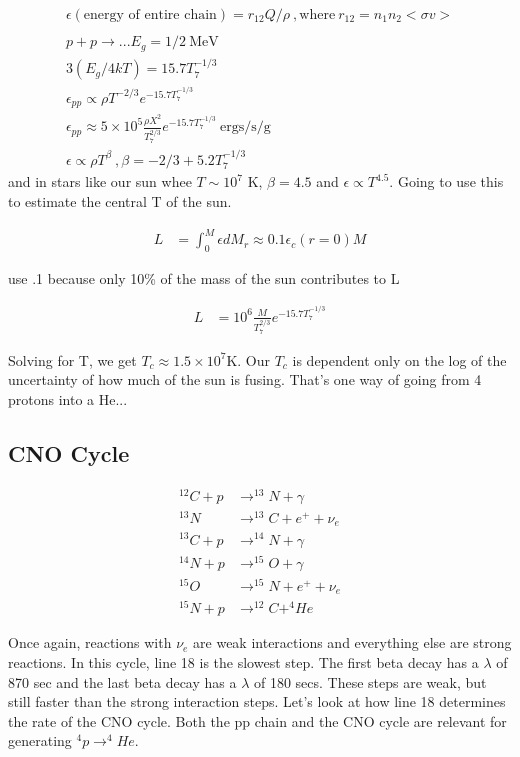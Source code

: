 \documentclass[10pt,a4paper]{article}
\begin{document}
\begin{align}
\epsilon (\text{energy of entire chain}) = r_{12} Q / \rho ~,\text{where}~ r_{12}= n_1n_2<\sigma v>\\
\\
p + p \rightarrow ... E_g = 1/2 ~\text{MeV}\\
3 (E_g/4kT) = 15.7T_7^{-1/3}\\
\epsilon_{pp}  \propto \rho T^{-2/3} e^{-15.7 T_7^{-1/3}}\\
\epsilon_{pp}  \approx 5 \times 10^5 \frac{\rho X^2}{T_7^{2/3}}e^{-15.7 T_7^{-1/3}}~\text{ergs/s/g}\\
\epsilon \propto \rho T^\beta~,\beta = -2/3 + 5.2T_7^{-1/3}
\end{align}
and in stars like our sun whee $T \sim 10^7$ K, $\beta = 4.5$ and $\epsilon \propto T^{4.5}$. Going to use this to estimate the central T of the sun. 

\begin{align}
L &= \int_0^M \epsilon dM_r \approx 0.1 \epsilon_c(r=0)M
\end{align}

use .1 because only 10\% of the mass of the sun contributes to L

\begin{align}
L &= 10^6 \frac{M}{T_7^{2/3}}e^{-15.7T_7^{-1/3}}
\end{align}

Solving for T, we get $T_c \approx 1.5 \times 10^7$K. Our $T_c$ is dependent only on the log of the uncertainty of how much of the sun is fusing. That's one way of going from 4 protons into a He...

\subsection{CNO Cycle}

\begin{align}
^{12}C + p & \rightarrow ^{13}N + \gamma \\
^{13} N & \rightarrow ^{13}C + e^+ + \nu_e\\
^{13}C + p  & \rightarrow ^{14}N + \gamma\\
^{14}N + p & \rightarrow ^{15}O + \gamma\\
^{15}O & \rightarrow ^{15}N + e^+ + \nu_e\\
^{15}N + p & \rightarrow ^{12}C + ^4He
\end{align}

Once again, reactions with $\nu_e$ are weak interactions and everything else are strong reactions. In this cycle, line 18 is the slowest step. The first beta decay has a $\lambda$ of 870 sec and the last beta decay has a $\lambda$ of 180 secs. These steps are weak, but still faster than the strong interaction steps. Let's look at how line 18 determines the rate of the CNO cycle. Both the pp chain and the CNO cycle are relevant for generating $ ^4p \rightarrow ^4He$. 
\end{document}
